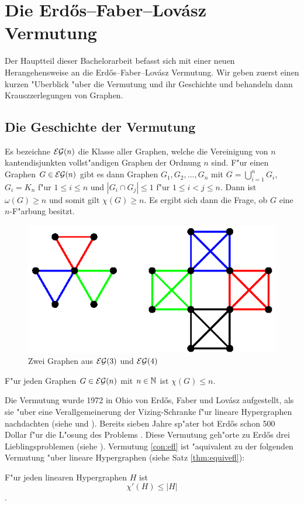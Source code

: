 \section{Die Erd\H{o}s--Faber--Lov\'asz Vermutung}
Der Hauptteil dieser Bachelorarbeit befasst sich mit einer neuen Herangehensweise an die Erd\H{o}s--Faber--Lov\'asz Vermutung. Wir geben zuerst einen kurzen "Uberblick "uber die Vermutung und ihr Geschichte und behandeln dann Krauszzerlegungen von Graphen. 
\subsection{Die Geschichte der Vermutung}
Es bezeichne ${\cal EG}(n)$ die Klasse aller Graphen, welche die Vereinigung von $n$ kantendisjunkten vollst"andigen Graphen der Ordnung $n$ sind. 
F"ur einen Graphen $G\in {\cal EG}(n)$ gibt es dann Graphen $G_1,G_2,\dots,G_n$ mit $G= \bigcup\limits_{i=1}^{n} G_i$, $G_i = K_n$ f"ur $1\leq i \leq n$ und $|G_i \cap G_j| \leq 1$ f"ur $1\leq i < j \leq n$. Dann ist $\omega(G) \geq n$ und somit gilt $\chi(G) \geq n$. Es ergibt sich dann die Frage, ob $G$ eine $n$-F"arbung besitzt.
\begin{figure}[h]
  \centering
  \includegraphics{images/bildeg3und4}
  \caption{Zwei Graphen aus ${\cal EG}(3)$ und ${\cal EG}(4)$}
  \label{fig:egraphen}
\end{figure}
\begin{conjecture}
  F"ur jeden Graphen $G\in{\cal EG}(n)$ mit $n\in{\mathbb{N}}$ ist $\chi(G) \leq n$.
  \label{con:efl}
\end{conjecture}

Die Vermutung wurde 1972 in Ohio von Erd\H{o}s, Faber und Lov\'asz aufgestellt, als sie "uber eine Verallgemeinerung der Vizing-Schranke f"ur lineare Hypergraphen nachdachten (siehe \cite{FaberL74} und \cite{Erdos76}). Bereits sieben Jahre sp"ater bot Erd\H{o}s schon 500 Dollar f"ur die L"osung des Problems \cite{Erdos79}.
Diese Vermutung geh"orte zu Erd\H{o}s drei Lieblingsproblemen (siehe \cite{Erdos81}).  
Vermutung \ref{con:efl} ist "aquivalent zu der folgenden Vermutung "uber lineare Hypergraphen (siehe Satz \ref{thm:equivefl}):
\begin{conjecture}
  F"ur jeden linearen Hypergraphen $H$ ist $$\chi'(H) \leq |H|$$.
  \label{con:eflhyper}
\end{conjecture}

